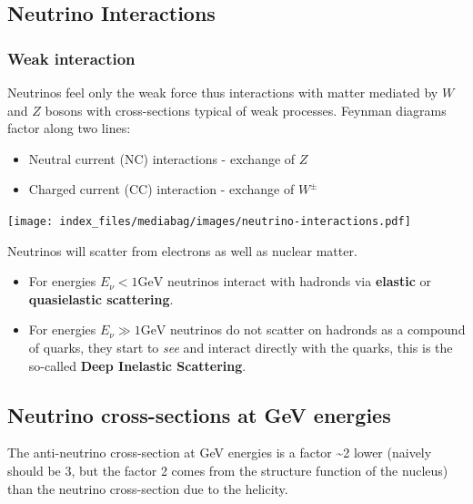 \documentclass[
  letterpaper,
  DIV=11,
  numbers=noendperiod]{scrreprt}
\providecommand{\tightlist}{%
  \setlength{\itemsep}{0pt}\setlength{\parskip}{0pt}}\usepackage{longtable,booktabs,array}
\begin{document}
\subsection{Neutrino Interactions}\label{neutrino-interactions}

\subsubsection{Weak interaction}\label{weak-interaction}

Neutrinos feel only the weak force thus interactions with matter
mediated by \(W\) and \(Z\) bosons with cross-sections typical of weak
processes. Feynman diagrams factor along two lines:

\begin{itemize}
\tightlist
\item
  Neutral current (NC) interactions - exchange of \(Z\)
\item
  Charged current (CC) interaction - exchange of \(W^{\pm}\)
\end{itemize}

\begin{center}
\texttt{[image: index\_files/mediabag/images/neutrino-interactions.pdf]}
\end{center}

Neutrinos will scatter from electrons as well as nuclear matter.

\begin{itemize}
\item
  For energies \(E_\nu < 1 \mathrm{GeV}\) neutrinos interact with
  hadronds via \textbf{elastic} or \textbf{quasielastic scattering}.
\item
  For energies \(E_\nu \gg 1 \mathrm{GeV}\) neutrinos do not scatter on
  hadronds as a compound of quarks, they start to \emph{see} and
  interact directly with the quarks, this is the so-called \textbf{Deep
  Inelastic Scattering}.
\end{itemize}

\subsection{Neutrino cross-sections at GeV
energies}\label{neutrino-cross-sections-at-gev-energies}

The anti-neutrino cross-section at GeV energies is a factor
\textasciitilde2 lower (naively should be 3, but the factor 2 comes from
the structure function of the nucleus) than the neutrino cross-section
due to the helicity.
\end{document}
